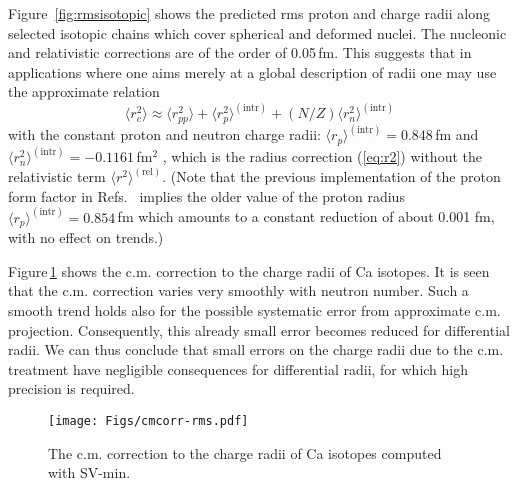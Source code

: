\documentclass[aps,prc,twocolumn,floatfix,nofootinbib,preprintnumbers,superscriptaddress,longbibliography]{revtex4-1}
\begin{document}
Figure~\ref{fig:rmsisotopic} shows the predicted  rms proton and charge radii along  selected isotopic 
 chains which cover spherical and deformed nuclei. 
 The nucleonic and relativistic corrections are of the order of 0.05\,fm. This suggests that in applications where one aims merely at a global description of radii one may use the approximate relation \cite{Friar1975}
 \begin{equation}\label{eq:approxr}
\langle r^2_c\rangle
 \approx 
  \langle r^2_{pp}\rangle
  +
\langle r^2_p\rangle^\mathrm{(intr)} +
(N/Z) \langle r^2_n\rangle^\mathrm{(intr)}
\end{equation} 
with the constant proton and neutron  charge radii:
$ \langle r_p\rangle^\mathrm{(intr)}=0.848$\,fm \cite{Grinin2020} and
$\langle r^2_n\rangle^\mathrm{(intr)}=-0.1161$\,fm$^2$ \cite{PDG},
which is the radius correction (\ref{eq:r2}) without the relativistic term $\langle r^2\rangle^\mathrm{(rel)}$. (Note that the previous implementation of the proton form factor in Refs.~\cite{Simon1980,Walther1986,Reinhard2013}
implies the older value of the proton radius $\langle r_p\rangle^\mathrm{(intr)}=0.854$\,fm
which amounts to a constant reduction of about 0.001 fm, with  no  effect on trends.)

Figure\,\ref{fig:cmcorr} shows the c.m. correction to the charge radii of  Ca isotopes. It is seen that
the c.m. correction varies very smoothly with neutron number. Such a smooth trend holds also for the possible systematic error from approximate c.m. projection. Consequently, this already small error becomes reduced for differential radii.
We can thus conclude that small errors on
the charge radii due to the c.m. treatment have  negligible consequences for differential
radii,  for which  high precision is required.


\begin{figure}[htb]
\texttt{[image: Figs/cmcorr-rms.pdf]}
\caption{\label{fig:cmcorr}
The c.m. correction to the charge radii of  Ca isotopes computed with SV-min.
}
\end{figure}
\end{document}
